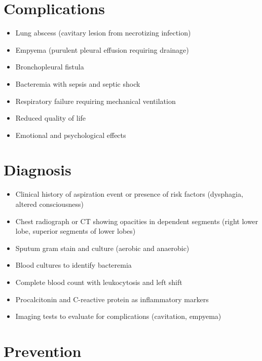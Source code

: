\section{Complications}

\begin{itemize}[noitemsep]
  \item Lung abscess (cavitary lesion from necrotizing infection)
  \item Empyema (purulent pleural effusion requiring drainage)
  \item Bronchopleural fistula
  \item Bacteremia with sepsis and septic shock
  \item Respiratory failure requiring mechanical ventilation
  \item Reduced quality of life
  \item Emotional and psychological effects
\end{itemize}

\section{Diagnosis}

\begin{itemize}[noitemsep]
  \item Clinical history of aspiration event or presence of risk factors (dysphagia, altered consciousness)
  \item Chest radiograph or CT showing opacities in dependent segments (right lower lobe, superior segments of lower lobes)
  \item Sputum gram stain and culture (aerobic and anaerobic)
  \item Blood cultures to identify bacteremia
  \item Complete blood count with leukocytosis and left shift
  \item Procalcitonin and C-reactive protein as inflammatory markers
  \item Imaging tests to evaluate for complications (cavitation, empyema)
\end{itemize}

\section{Prevention}

